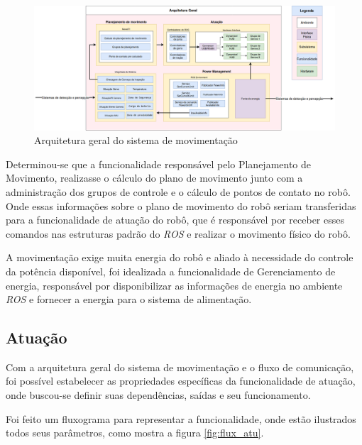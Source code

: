 \begin{figure}[H]
	\centering
	\includegraphics[scale=0.25]{Figures/ArquiteturaPORTUGUES.png}
	\caption{Arquitetura geral do sistema de movimentação}
	\label{fig:arq_geral}
\end{figure}
Determinou-se que a funcionalidade responsável pelo Planejamento de Movimento, realizasse o cálculo do plano de movimento junto com a administração dos grupos de controle e o cálculo de pontos de contato no robô. Onde essas informações sobre o plano de movimento do robô seriam transferidas para a funcionalidade de atuação do robô, que é responsável por receber esses comandos nas estruturas padrão do \textit{ROS} e realizar o movimento físico do robô.

A movimentação exige muita energia do robô e aliado à necessidade do controle da potência disponível, foi idealizada a funcionalidade de Gerenciamento de energia, responsável por disponibilizar as informações de energia no ambiente \textit{ROS} e fornecer a energia para o sistema de alimentação.

\subsection{Atuação}\label{sec:actuation}
Com a arquitetura geral do sistema de movimentação e o fluxo de comunicação, foi possível estabelecer as propriedades específicas da funcionalidade de atuação, onde buscou-se definir suas dependências, saídas e seu funcionamento.

Foi feito um fluxograma para representar a funcionalidade, onde estão ilustrados todos seus parâmetros, como mostra a figura \ref{fig:flux_atu}.

